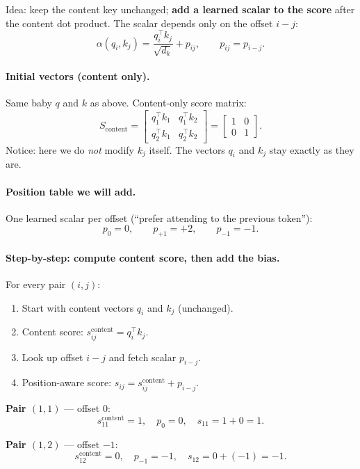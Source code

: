\documentclass[11pt]{article}
\begin{document}
Idea: keep the content key unchanged; \textbf{add a learned scalar to the
score} after the content dot product. The scalar depends only on the offset
\(i-j\):
\[
  \alpha(q_i,k_j)
  =
  \frac{q_i^\top k_j}{\sqrt{d_k}} + p_{ij},
  \qquad
  p_{ij}=p_{i-j}.
\]

\paragraph{Initial vectors (content only).}
Same baby \(q\) and \(k\) as above. Content-only score matrix:
\[
  S_{\text{content}}
  =
  \begin{bmatrix}
    q_1^\top k_1 & q_1^\top k_2 \\
    q_2^\top k_1 & q_2^\top k_2
  \end{bmatrix}
  =
  \begin{bmatrix}1&0\\0&1\end{bmatrix}.
\]
Notice: here we do \emph{not} modify \(k_j\) itself. The vectors
\(q_i\) and \(k_j\) stay exactly as they are.

\paragraph{Position table we will add.}
One learned scalar per offset (``prefer attending to the previous token''):
\[
  p_{0}=0,\qquad p_{+1}=+2,\qquad p_{-1}=-1.
\]

\paragraph{Step-by-step: compute content score, then add the bias.}
For every pair \((i,j)\):
\begin{enumerate}[leftmargin=*]
  \item Start with content vectors \(q_i\) and \(k_j\) (unchanged).
  \item Content score: \(s^{\text{content}}_{ij}=q_i^\top k_j\).
  \item Look up offset \(i-j\) and fetch scalar \(p_{i-j}\).
  \item Position-aware score:
        \(s_{ij}=s^{\text{content}}_{ij}+p_{i-j}\).
\end{enumerate}

\textbf{Pair \((1,1)\)} --- offset \(0\):
\[
  s^{\text{content}}_{11}=1,\quad
  p_{0}=0,\quad
  s_{11}=1+0=1.
\]

\textbf{Pair \((1,2)\)} --- offset \(-1\):
\[
  s^{\text{content}}_{12}=0,\quad
  p_{-1}=-1,\quad
  s_{12}=0+(-1)=-1.
\]
\end{document}
